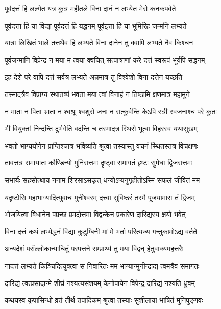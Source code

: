 \twolineshloka
{पूर्वदत्तं हि लल्गेत यत्र कुत्र महीतले}
{विना दानं न लभ्येत मेरो कनकपर्वते} %

\twolineshloka
{पूर्वदत्ता हि या विद्या पूर्वदत्तं हि यद्धनम्}
{पूर्वइत्ता हि या भूमिरिह जन्मनि लभ्यते} %

\twolineshloka
{यात्रा लिखितं भाले तत्तथैव हि लभ्यते}
{विना दानेन तु क्वापि लभ्यते नैव किश्चन} %

\twolineshloka
{पूर्वजन्मानि विप्रेन्द्र न मया म त्वया क्वचित्}
{सत्पात्राणां करे दत्तं स्वरूपं भूर्यपि सद्धनम्} %

\twolineshloka
{इह देशे परे वापि दत्तं सर्वत्र लभ्यते}
{अन्नमात्र तु विश्वेशो विना दत्तेन यच्छति} %

\twolineshloka
{तस्मादत्रैव विप्राग्य स्थातव्यं भवता मया}
{त्वां विनाहं न तिष्ठामि क्षणमात्र महामुने} %

\twolineshloka
{न माता न पिता भ्राता न श्वश्रूः श्वशुरो जनः}
{न सत्कुर्वन्ति केऽपि स्त्री स्वजनाश्च परे कुतः} %

\twolineshloka
{भी वियुक्तां निन्दन्ति दुर्भगेति वदन्ति च}
{तस्मादत्र स्थिरो भूत्वा विहरस्व यथासुखम्} %

\twolineshloka
{भवतो भाग्ययोगेन प्राप्तिश्चात्र भविष्यति}
{श्रुत्वा तस्यास्तु वचनं स्थितस्तत्र विचक्षणः} %

\twolineshloka
{तावत्तत्र समायातः कौण्डिन्यो मुनिसत्तमः}
{दृष्ट्वा समागतं हृष्टः सुमेधा द्विजसत्तमः} %

\twolineshloka
{सभार्यः सहसोत्थाय ननाम शिरसाऽसकृत्}
{धन्योऽप्यनुगृहीतोऽस्मि सफलं जीवितं मम} %

\twolineshloka
{यदृष्टोसि महाभाग्यादित्युवाच मुनीश्वरम्}
{दत्त्वा सुविष्ठरं तस्मै पूजयामास तं द्विजम्} %

\twolineshloka
{भोजयित्वा विधानेन पप्रच्छ प्रमदोत्तमा}
{विद्वन्केन प्रकारेण दारिद्यस्य क्षयो भवेत्} %

\twolineshloka
{विना दत्तं कथं लभ्येद्धनं विद्या कुटुम्बिनी}
{मां मे भर्ता परित्यज्य गन्तुकामोऽद्य वर्तते} %

\twolineshloka
{अन्यदेशं परॉल्लोकान्याचितुं परपत्तने}
{सम्प्रार्थ्य तु मया विद्वन् हेतुवाक्यमहत्तरैः} %

\twolineshloka
{नादत्तं लभ्यते किञ्चिदित्युक्त्वा स निवारितः}
{मम भाग्यान्मुनीन्द्राद्य त्वमत्रैव समागतः} %

\twolineshloka
{दारिद्यं त्वत्प्रसादान्मे शीघ्रं नश्यत्यसंशयम्}
{केनोपायेन विपेन्द्र दारिद्यं नश्यति ध्रुवम्} %

\twolineshloka
{कथयस्व कृपासिन्धो व्रतं तीर्थ तपादिकम्}
{श्रुत्वा तस्याः सुशीलाया भाषितं मुनिपुङ्गवः} %

